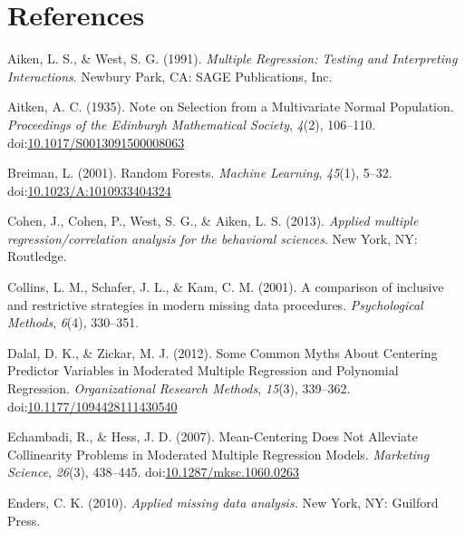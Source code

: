 \documentclass[english,man]{apa6}
\theoremstyle{definition}
\theoremstyle{definition}
\theoremstyle{remark}
\begin{document}
\newpage

\section{References}\label{references}

\setlength{\parindent}{-0.5in} \setlength{\leftskip}{0.5in}

\hypertarget{refs}{}
\hypertarget{ref-aiken_multiple_1991}{}
Aiken, L. S., \& West, S. G. (1991). \emph{Multiple Regression: Testing
and Interpreting Interactions}. Newbury Park, CA: SAGE Publications,
Inc.

\hypertarget{ref-aitken_note_1935}{}
Aitken, A. C. (1935). Note on Selection from a Multivariate Normal
Population. \emph{Proceedings of the Edinburgh Mathematical Society},
\emph{4}(2), 106--110.
doi:\href{https://doi.org/10.1017/S0013091500008063}{10.1017/S0013091500008063}

\hypertarget{ref-breiman_random_2001}{}
Breiman, L. (2001). Random Forests. \emph{Machine Learning},
\emph{45}(1), 5--32.
doi:\href{https://doi.org/10.1023/A:1010933404324}{10.1023/A:1010933404324}

\hypertarget{ref-cohen_applied_2013}{}
Cohen, J., Cohen, P., West, S. G., \& Aiken, L. S. (2013). \emph{Applied
multiple regression/correlation analysis for the behavioral sciences}.
New York, NY: Routledge.

\hypertarget{ref-collins_comparison_2001}{}
Collins, L. M., Schafer, J. L., \& Kam, C. M. (2001). A comparison of
inclusive and restrictive strategies in modern missing data procedures.
\emph{Psychological Methods}, \emph{6}(4), 330--351.

\hypertarget{ref-dalal_common_2012}{}
Dalal, D. K., \& Zickar, M. J. (2012). Some Common Myths About Centering
Predictor Variables in Moderated Multiple Regression and Polynomial
Regression. \emph{Organizational Research Methods}, \emph{15}(3),
339--362.
doi:\href{https://doi.org/10.1177/1094428111430540}{10.1177/1094428111430540}

\hypertarget{ref-echambadi_mean-centering_2007}{}
Echambadi, R., \& Hess, J. D. (2007). Mean-Centering Does Not Alleviate
Collinearity Problems in Moderated Multiple Regression Models.
\emph{Marketing Science}, \emph{26}(3), 438--445.
doi:\href{https://doi.org/10.1287/mksc.1060.0263}{10.1287/mksc.1060.0263}

\hypertarget{ref-enders_applied_2010}{}
Enders, C. K. (2010). \emph{Applied missing data analysis.} New York,
NY: Guilford Press.
\end{document}
